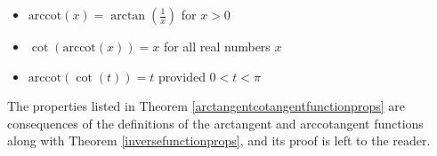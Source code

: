 \documentclass{ximera}
\begin{document}
\begin{theorem}
\begin{itemize}
\begin{itemize}
\item  $\text{arccot}(x) =\arctan\left(\frac{1}{x}\right)$ for $x > 0$

\item  $\cot\left(\text{arccot}(x)\right) = x$ for all real numbers $x$

\item  $\text{arccot}(\cot(t)) = t$ provided $0 < t < \pi$

\end{itemize}

\end{itemize}

\end{theorem}

 


 

The properties listed in Theorem \ref{arctangentcotangentfunctionprops} are consequences of the definitions of the arctangent and arccotangent functions along with Theorem \ref{inversefunctionprops}, and its proof is left to the reader.
\end{document}
